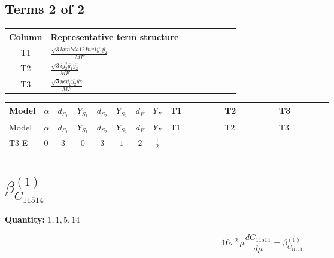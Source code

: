 \documentclass[8pt]{article}
\begin{document}
\begin{landscape}
\subsection*{Terms 2 of 2}
\begin{center}
\begin{tabular}{@{}c >{\raggedright\arraybackslash}p{0.82\linewidth}@{}}
\toprule
Column & Representative term structure \\
\midrule
T1 & \(\displaystyle \frac{\sqrt{3} lambda12Inv1 \overline{y_{1}} \overline{y_{2}}}{MF}\) \\
\midrule
T2 & \(\displaystyle \frac{\sqrt{3} i g_{2}^{2} \overline{y_{1}} \overline{y_{2}}}{MF}\) \\
\midrule
T3 & \(\displaystyle \frac{\sqrt{3} ye \overline{y_{1}} \overline{y_{2}} \overline{ye}}{MF}\) \\
\midrule
\bottomrule
\end{tabular}
\end{center}
\smallskip
\tiny
\begin{longtable}{@{}llcccccc >{\raggedright\arraybackslash}p{0.21\linewidth} >{\raggedright\arraybackslash}p{0.21\linewidth} >{\raggedright\arraybackslash}p{0.21\linewidth}@{}}
\toprule
Model & $\alpha$ & $d_{S_1}$ & $Y_{S_1}$ & $d_{S_2}$ & $Y_{S_2}$ & $d_F$ & $Y_F$ & T1 & T2 & T3 \\
\midrule
\endfirsthead
\toprule
Model & $\alpha$ & $d_{S_1}$ & $Y_{S_1}$ & $d_{S_2}$ & $Y_{S_2}$ & $d_F$ & $Y_F$ & T1 & T2 & T3 \\
\midrule
\endhead
T3-E & $0$ & $3$ & $0$ & $3$ & $1$ & $2$ & $\frac{1}{2}$ & \scriptsize\adjustbox{max width=\linewidth}{$\begin{gathered} \frac{\sqrt{3} lambda12Inv1 \overline{y_{1}} \overline{y_{2}}}{6 MF}\end{gathered}$} & \scriptsize\adjustbox{max width=\linewidth}{$\begin{gathered} - \frac{\sqrt{3} i g_{2}^{2} \overline{y_{1}} \overline{y_{2}}}{6 MF}\end{gathered}$} & \scriptsize\adjustbox{max width=\linewidth}{$\begin{gathered} \frac{\sqrt{3} ye \overline{y_{1}} \overline{y_{2}} \overline{ye}}{12 MF}\end{gathered}$} \\
\midrule
\bottomrule
\end{longtable}
\clearpage
\section*{$\beta_{C_{11514}}^{(1)}$}
\noindent\textbf{Quantity: }$\mathrm{1,1,5,14}$\par\smallskip
\[16\pi^2\,\mu\frac{d C_{11514}}{d\mu}=\beta_{C_{11514}}^{(1)}\]

\end{landscape}
\end{document}

